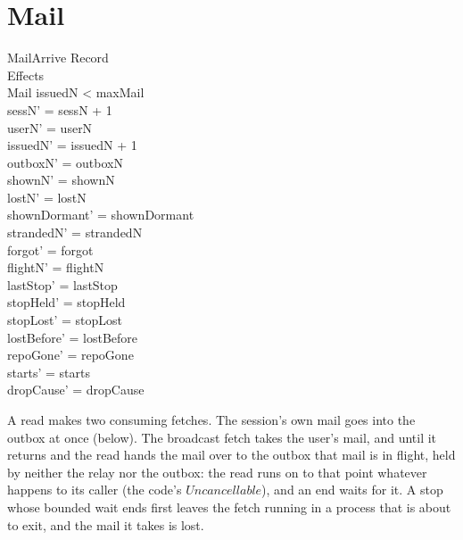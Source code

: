 \documentclass[a4paper,10pt,fleqn]{article}
\begin{document}
\section{Mail}

\begin{schema}{MailArrive}
  \Xi Record \\
  \Xi Effects \\
  \Delta Mail
  \where
  issuedN < maxMail \\
  sessN' = sessN + 1 \\
  userN' = userN \\
  issuedN' = issuedN + 1 \\
  outboxN' = outboxN \\
  shownN' = shownN \\
  lostN' = lostN \\
  shownDormant' = shownDormant \\
  strandedN' = strandedN \\
  forgot' = forgot \\
  flightN' = flightN \\
  lastStop' = lastStop \\
  stopHeld' = stopHeld \\
  stopLost' = stopLost \\
  lostBefore' = lostBefore \\
  repoGone' = repoGone \\
  starts' = starts \\
  dropCause' = dropCause
\end{schema}

A read makes two consuming fetches.  The session's own mail goes into the outbox at once
(below).  The broadcast fetch takes the user's mail, and until it returns and the read
hands the mail over to the outbox that mail is in flight, held by neither the relay nor the
outbox: the read runs on to that point whatever happens to its caller (the code's
$Uncancellable$), and an end waits for it.  A stop whose bounded wait ends first leaves
the fetch running in a process that is about to exit, and the mail it takes is lost.
\end{document}
